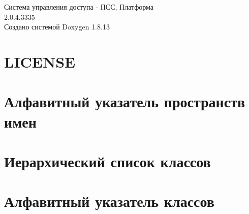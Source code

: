 \documentclass[twoside]{book}
\newcommand{\+}{\discretionary{\mbox{\scriptsize$\hookleftarrow$}}{}{}}
\newcommand{\clearemptydoublepage}{%
  \newpage{\pagestyle{empty}\cleardoublepage}%
}
\begin{document}
\hypersetup{pageanchor=false,
             bookmarksnumbered=true,
             pdfencoding=unicode
            }
\begin{titlepage}
\vspace*{7cm}
\begin{center}%
{\Large Система управления доступа -\/ ПСС, Платформа \\[1ex]\large 2.\+0.\+4.\+3335 }\\
\vspace*{1cm}
{\large Создано системой Doxygen 1.8.13}\\
\end{center}
\end{titlepage}
\clearemptydoublepage
{}
\tableofcontents
\clearemptydoublepage
{}
\hypersetup{pageanchor=true}

\chapter{L\+I\+C\+E\+N\+SE}
\label{md__c_1__t_f_s2__access_rights_packages__newtonsoft_8_json_810_80_82__l_i_c_e_n_s_e}

\chapter{Алфавитный указатель пространств имен}

\chapter{Иерархический список классов}

\chapter{Алфавитный указатель классов}

\end{document}
